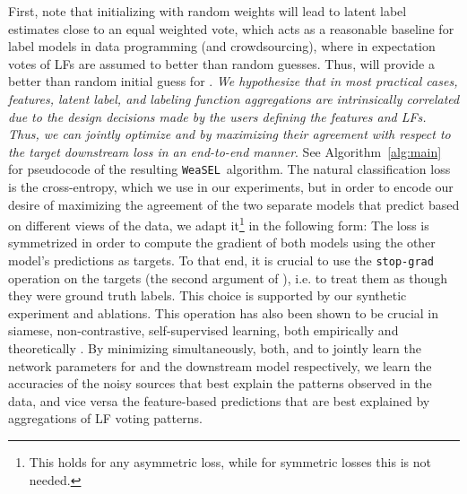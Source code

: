 \documentclass{article}
\newcommand{\weasel}{\texttt{WeaSEL}}\newcommand{\brackets}[1]{\left( #1 \right)}
\newcommand{\encoder}{}
\begin{document}
First, note that initializing \encoder  with random weights will lead to latent label estimates close to an equal weighted vote, which acts as a reasonable baseline for label models in data programming (and crowdsourcing), where in expectation votes of LFs are assumed to better than random guesses. Thus,  will provide a better than random initial guess for .
\emph{We hypothesize that in most practical cases, features, latent label, and labeling function aggregations are intrinsically correlated due to the design decisions made by the users defining the features and LFs. Thus, we can jointly optimize  and   by maximizing their agreement with respect to the target downstream loss  in an end-to-end manner}. 
See Algorithm~\ref{alg:main} for pseudocode of the resulting \weasel\  algorithm.
The natural classification loss is the cross-entropy, which we use in our experiments, but in order to encode our desire of maximizing the agreement of the two separate models that predict based on different views of the data, we adapt it\footnote{This holds for any asymmetric loss, while for symmetric losses this is not needed.} in the following form:
The loss is symmetrized in order to compute the gradient of both models using the other model's predictions as targets.
To that end, it is crucial to use the \texttt{stop-grad} operation on the targets (the second argument of ), i.e. to treat them as though they were ground truth labels.
This choice is supported by our synthetic experiment and ablations.
This operation has also been shown to be crucial in siamese, non-contrastive, self-supervised learning, both empirically \cite{BYOL, simSiam} and theoretically \cite{tian2021understanding}.
By minimizing simultaneously, both,  and  to jointly learn the network parameters for  and the downstream model  respectively, we learn the accuracies of the noisy sources  that best explain the patterns observed in the data, and vice versa the feature-based predictions that are best explained by aggregations of LF voting patterns.
\end{document}
